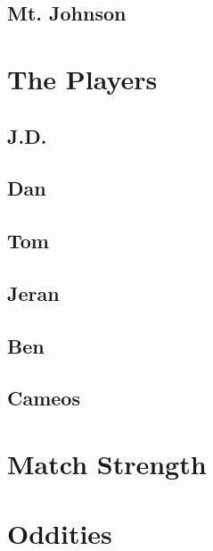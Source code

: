     \section{Mt. Johnson}
  \chapter{The Players}
    \section{J.D.}
    \section{Dan}
    \section{Tom}
    \section{Jeran}
    \section{Ben}
    \section{Cameos}
  \chapter{Match Strength}
  \chapter{Oddities}